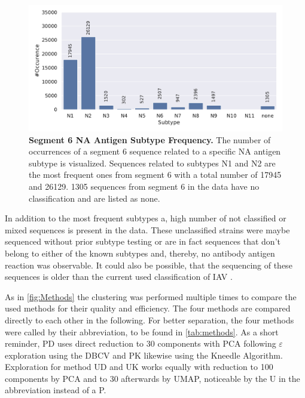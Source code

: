 \begin{figure}[!hbt]
    \centering
    \includegraphics[width=\textwidth]{PCA/Data_Overview_Segment_6_N.pdf}
    \caption[Segment 6 \Acrlong{NA} Antigen Subtype Frequency]{\textbf{Segment 6 \Acrlong{NA} Antigen Subtype Frequency.} The number of occurrences of a segment 6 sequence related to a specific \gls{NA} antigen subtype is visualized. Sequences related to subtypes N1 and N2 are the most frequent ones from segment 6 with a total number of 17945 and 26129. 1305 sequences from segment 6 in the data have no classification and are listed as \glqq none\grqq{}.}
    \label{fig:Frequency_6}
\end{figure}

In addition to the most frequent subtypes a, high number of not classified or \glqq mixed\grqq{} sequences is present in the data. These unclassified strains were maybe sequenced without prior subtype testing or are in fact sequences that don't belong to either of the known subtypes and, thereby, no antibody antigen reaction was observable. It could also be possible, that the sequencing of these sequences is older than the current used classification of \gls{IAV} \autocite{noauthor_revision_1980}. 

As in \autoref{fig:Methods} the clustering was performed multiple times to compare the used methods for their quality and efficiency. The four methods are compared directly to each other in the following. For better separation, the four methods were called by their abbreviation, to be found in \autoref{tab:methods}. As a short reminder, PD uses direct reduction to 30 components with \gls{PCA} following $\varepsilon$ exploration using the \gls{DBCV} and PK likewise using the Kneedle Algorithm. Exploration for method UD and UK works equally with reduction to 100 components by \gls{PCA} and to 30 afterwards by \gls{UMAP}, noticeable by the U in the abbreviation instead of a P.   


